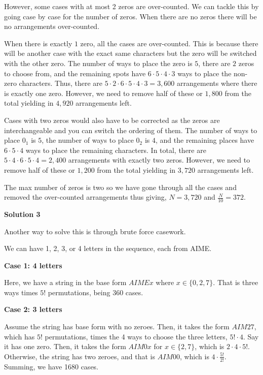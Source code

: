 \begin{enumerate}
 However, some cases with at most 2 zeros are over-counted. We can tackle this by going case by case for the number of zeros. When there are no zeros there will be no arrangements over-counted. 

 When there is exactly $1$ zero, all the cases are over-counted. This is because there will be another case with the exact same characters but the zero will be switched with the other zero. The number of ways to place the zero is $5$, there are $2$ zeros to choose from, and the remaining spots have $6 \cdot 5 \cdot 4 \cdot 3$ ways to place the non-zero characters. Thus, there are $5 \cdot 2 \cdot 6 \cdot 5 \cdot 4 \cdot 3 = 3,600$ arrangements where there is exactly one zero. However, we need to remove half of these or $1,800$ from the total yielding in $4,920$ arrangements left.

 Cases with two zeros would also have to be corrected as the zeros are interchangeable and you can switch the ordering of them. The number of ways to place $0_1$ is $5$, the number of ways to place $0_2$ is $4$, and the remaining places have $6 \cdot 5 \cdot 4$ ways to place the remaining characters. In total, there are $5 \cdot 4 \cdot 6 \cdot 5 \cdot 4 = 2,400$ arrangements with exactly two zeros. However, we need to remove half of these or $1,200$ from the total yielding in $3,720$ arrangements left.

 The max number of zeros is two so we have gone through all the cases and removed the over-counted arrangements thus giving, $N = 3,720$ and $\frac{N}{10} = \boxed{372}$.

 



\textbf{Solution 3}

Another way to solve this is through brute force casework.

 We can have 1, 2, 3, or 4 letters in the sequence, each from AIME. 

 \textbf{Case 1: 4 letters}

 Here, we have a string in the base form $AIMEx$ where $x \in \{0,2,7 \}$. That is three ways times $5!$ permutations, being 360 cases.

 \textbf{Case 2: 3 letters}

 Assume the string has base form with no zeroes. Then, it takes the form $AIM27$, which has $5!$ permutations, times the 4 ways to choose the three letters, $5! \cdot 4$. Say it has one zero. Then, it takes the form $AIM0x$ for $x \in \{2,7 \}$, which is $2 \cdot 4 \cdot  5!$. Otherwise, the string has two zeroes, and that is $AIM00$, which is $4 \cdot \frac{5!}{2!}$. Summing, we have 1680 cases.


\end{enumerate}
